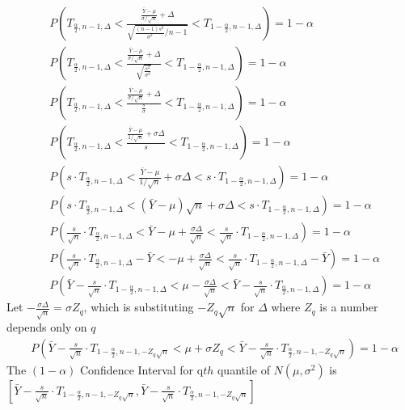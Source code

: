 \documentclass[11pt,letterpaper]{article}
\begin{document}
\begin{align*}
& P(T_{\frac{\alpha}{2}, n-1, \Delta} < \frac{\frac{\bar{Y} - \mu }{\sigma / \sqrt{n}} + \Delta}{\sqrt{\frac{(n-1) s^2}{\sigma^2} / n-1}} < T_{1-\frac{\alpha}{2}, n-1, \Delta}) = 1- \alpha \\
& P(T_{\frac{\alpha}{2}, n-1, \Delta} < \frac{\frac{\bar{Y} - \mu }{\sigma / \sqrt{n}} + \Delta}{\sqrt{\frac{s^2}{\sigma^2}}} < T_{1-\frac{\alpha}{2}, n-1, \Delta}) = 1- \alpha \\
& P(T_{\frac{\alpha}{2}, n-1, \Delta} < \frac{\frac{\bar{Y} - \mu }{\sigma / \sqrt{n}} + \Delta}{\frac{s}{\sigma}} < T_{1-\frac{\alpha}{2}, n-1, \Delta}) = 1- \alpha \\
& P(T_{\frac{\alpha}{2}, n-1, \Delta} < \frac{\frac{\bar{Y} - \mu }{1 / \sqrt{n}} + \sigma  \Delta}{s} < T_{1-\frac{\alpha}{2}, n-1, \Delta}) = 1- \alpha \\
& P(s \cdot T_{\frac{\alpha}{2}, n-1, \Delta} < \frac{\bar{Y} - \mu }{1 / \sqrt{n}} + \sigma  \Delta < s \cdot T_{1-\frac{\alpha}{2}, n-1, \Delta}) = 1- \alpha \\
& P(s \cdot T_{\frac{\alpha}{2}, n-1, \Delta} < (\bar{Y} - \mu) \sqrt{n}  + \sigma  \Delta < s \cdot T_{1-\frac{\alpha}{2}, n-1, \Delta}) = 1- \alpha \\
& P(\frac{s}{\sqrt{n}} \cdot T_{\frac{\alpha}{2}, n-1, \Delta} < \bar{Y} - \mu + \frac{\sigma  \Delta}{\sqrt{n}}  < \frac{s}{\sqrt{n}} \cdot T_{1-\frac{\alpha}{2}, n-1, \Delta}) = 1- \alpha \\
& P(\frac{s}{\sqrt{n}} \cdot T_{\frac{\alpha}{2}, n-1, \Delta} - \bar{Y} < - \mu + \frac{\sigma  \Delta}{\sqrt{n}}  < \frac{s}{\sqrt{n}} \cdot T_{1-\frac{\alpha}{2}, n-1, \Delta} - \bar{Y}) = 1- \alpha \\
& P(\bar{Y} - \frac{s}{\sqrt{n}} \cdot T_{1-\frac{\alpha}{2}, n-1, \Delta} < \mu - \frac{\sigma \Delta}{\sqrt{n}} <  \bar{Y} - \frac{s}{\sqrt{n}} \cdot T_{\frac{\alpha}{2}, n-1, \Delta} ) = 1 - \alpha 
\end{align*}
\noindent Let $- \frac{\sigma \Delta}{\sqrt{n}} = \sigma Z_q$, which is substituting $- Z_q \sqrt{n}$ for $\Delta$ where $Z_q$ is a number depends only on $q$
\begin{align*}
& P(\bar{Y} - \frac{s}{\sqrt{n}} \cdot T_{1-\frac{\alpha}{2}, n-1, - Z_q \sqrt{n}} < \mu + \sigma Z_q <  \bar{Y} - \frac{s}{\sqrt{n}} \cdot T_{\frac{\alpha}{2}, n-1, - Z_q \sqrt{n}} ) = 1 - \alpha 
\end{align*}
\noindent The $(1 - \alpha)$ Confidence Interval for q$th$ quantile of $N(\mu, \sigma^2)$ is \\

$[\bar{Y} - \frac{s}{\sqrt{n}} \cdot T_{1-\frac{\alpha}{2}, n-1, - Z_q \sqrt{n}},  \bar{Y} - \frac{s}{\sqrt{n}} \cdot T_{\frac{\alpha}{2}, n-1, - Z_q \sqrt{n}}]$ 
\end{document}
